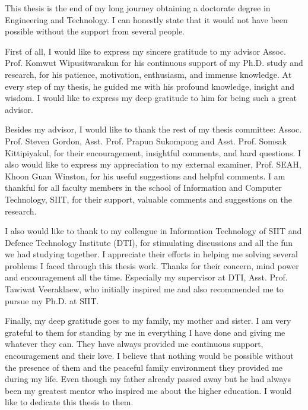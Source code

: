 %

This thesis is the end of my long journey obtaining a doctorate degree in Engineering and Technology. 
I can honestly state that it would not have been possible without the support from several people.

First of all, I would like to express my sincere gratitude to my advisor Assoc. Prof. Komwut Wipusitwarakun for his continuous support of my Ph.D. study and research, for his patience, motivation, enthusiasm, and immense knowledge.
At every step of my thesis, he guided me with his profound knowledge, insight and wisdom.
I would like to express my deep gratitude to him for being such a great advisor. 

Besides my advisor, I would like to thank the rest of my thesis committee: Assoc. Prof. Steven Gordon, Asst. Prof. Prapun Sukompong and Asst. Prof. Somsak Kittipiyakul, for their encouragement, insightful comments, and hard questions. I also would like to express my appreciation to my external examiner, Prof. SEAH, Khoon Guan Winston, for his useful suggestions and helpful comments. 
I am thankful for all faculty members in the school of Information and Computer Technology, SIIT, for their support, valuable comments and suggestions on the research.

I also would like to thank to my colleague in Information Technology of SIIT and Defence Technology Institute (DTI), for stimulating discussions and all the fun we had studying together. 
I appreciate their efforts in helping me solving several problems I faced through this thesis work.
Thanks for their concern, mind power and encouragement all the time.
Especially my supervisor at DTI, Asst. Prof. Tawiwat Veeraklaew, who initially inspired me and also recommended me to pursue my Ph.D. at SIIT.

Finally, my deep gratitude goes to my family, my mother and sister.
I am very grateful to them for standing by me in everything I have done and giving me whatever they can.
They have always provided me continuous support, encouragement and their love.
I believe that nothing would be possible without the presence of them and the peaceful family environment they provided me during my life.
Even though my father already passed away but he had always been my greatest mentor who inspired me about the higher education. 
I would like to dedicate this thesis to them.